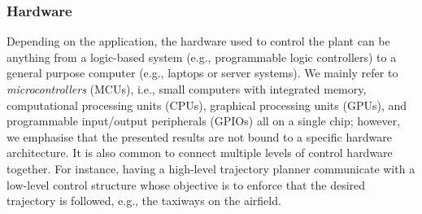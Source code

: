 \subsubsection{Hardware}%
%
Depending on the application, the hardware used to control the plant can be anything from a logic-based system (e.g., programmable logic controllers) to a general purpose computer (e.g., laptops or server systems).
We mainly refer to \emph{microcontrollers} (MCUs), i.e., small computers with integrated memory, computational processing units (CPUs), graphical processing units (GPUs), and programmable input/output peripherals (GPIOs) all on a single chip; however, we emphasise that the presented results are not bound to a specific hardware architecture.
It is also common to connect multiple levels of control hardware together.
For instance, having a high-level trajectory planner communicate with a low-level control structure whose objective is to enforce that the desired trajectory is followed, e.g., the taxiways on the airfield.

